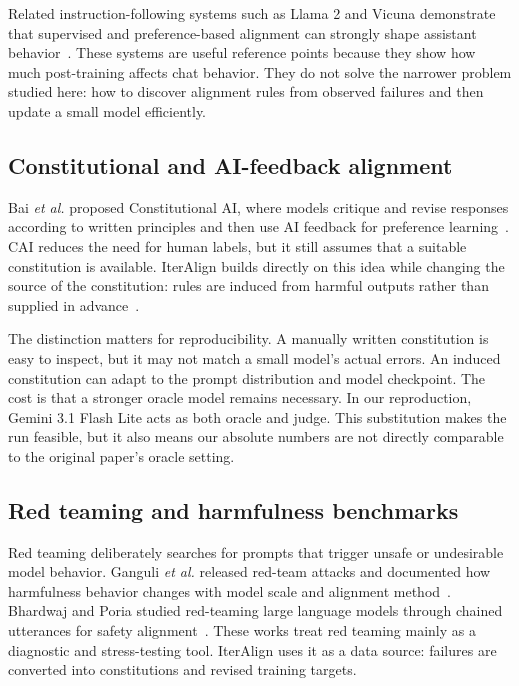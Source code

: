 \documentclass[10pt,twocolumn]{article}
\newcommand{\etal}{\textit{et al.}}
\begin{document}
Related instruction-following systems such as Llama 2 and Vicuna demonstrate that supervised and preference-based alignment can strongly shape assistant behavior~\cite{touvron2023llama2,vicunabench2023}. These systems are useful reference points because they show how much post-training affects chat behavior. They do not solve the narrower problem studied here: how to discover alignment rules from observed failures and then update a small model efficiently.

\subsection{Constitutional and AI-feedback alignment}
Bai \etal{} proposed Constitutional AI, where models critique and revise responses according to written principles and then use AI feedback for preference learning~\cite{bai2022cai}. CAI reduces the need for human labels, but it still assumes that a suitable constitution is available. IterAlign builds directly on this idea while changing the source of the constitution: rules are induced from harmful outputs rather than supplied in advance~\cite{chen2024iteralign}.

The distinction matters for reproducibility. A manually written constitution is easy to inspect, but it may not match a small model's actual errors. An induced constitution can adapt to the prompt distribution and model checkpoint. The cost is that a stronger oracle model remains necessary. In our reproduction, Gemini 3.1 Flash Lite acts as both oracle and judge. This substitution makes the run feasible, but it also means our absolute numbers are not directly comparable to the original paper's oracle setting.

\subsection{Red teaming and harmfulness benchmarks}
Red teaming deliberately searches for prompts that trigger unsafe or undesirable model behavior. Ganguli \etal{} released red-team attacks and documented how harmfulness behavior changes with model scale and alignment method~\cite{ganguli2022redteam}. Bhardwaj and Poria studied red-teaming large language models through chained utterances for safety alignment~\cite{bhardwaj2023redteaming}. These works treat red teaming mainly as a diagnostic and stress-testing tool. IterAlign uses it as a data source: failures are converted into constitutions and revised training targets.
\end{document}
